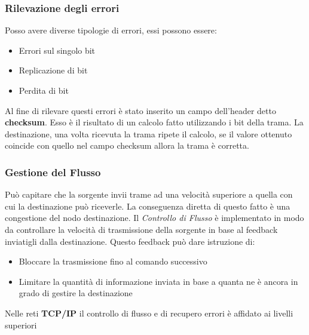 \documentclass{article}
\begin{document}
        \subsubsection{Rilevazione degli errori}
            Posso avere diverse tipologie di errori, essi possono essere:
            \begin{itemize}
                \item Errori sul singolo bit
                \item Replicazione di bit
                \item Perdita di bit
            \end{itemize}
            Al fine di rilevare questi errori è stato inserito un campo dell'header detto \textbf{checksum}. Esso è il risultato di un calcolo fatto utilizzando i bit della trama. La destinazione, una volta ricevuta la trama ripete il calcolo, se il valore ottenuto coincide con quello nel campo checksum allora la trama è corretta. 

        \subsubsection{Gestione del Flusso}
            Può capitare che la sorgente invii trame ad una velocità superiore a quella con cui la destinazione può riceverle. La conseguenza diretta di questo fatto è una congestione del nodo destinazione. Il \textit{Controllo di Flusso} è implementato in modo da controllare la velocità di trasmissione della sorgente in base al feedback inviatigli dalla destinazione. Questo feedback può dare istruzione di:
            \begin{itemize}
                \item Bloccare la trasmissione fino al comando successivo
                \item Limitare la quantità di informazione inviata in base a quanta ne è ancora in grado di gestire la destinazione
            \end{itemize}
            Nelle reti \textbf{TCP/IP} il controllo di flusso e di recupero errori è affidato ai livelli superiori
    
\newpage            
\end{document}
